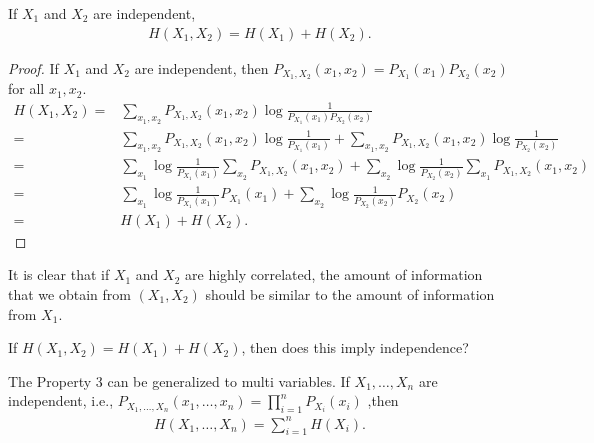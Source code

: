 \documentclass{article}
\begin{document}
\begin{theorem}
    If $X_1$ and $X_2$ are independent,
    \begin{align}
        H(X_1, X_2) = H(X_1) + H(X_2).
    \end{align}
\end{theorem}
\begin{proof}
If $X_1$ and $X_2$ are independent, then $P_{X_1, X_2} (x_1, x_2) = P_{X_1}(x_1) P_{X_2}(x_2)$ for all $x_1, x_2$.
\begin{align}
    H(X_1, X_2) =& \sum_{x_1, x_2} P_{X_1, X_2} (x_1, x_2) \log \frac{1}{P_{X_1}(x_1)P_{X_2}(x_2)}\\
    =& \sum_{x_1, x_2} P_{X_1, X_2} (x_1, x_2) \log \frac{1}{P_{X_1}(x_1)}
    + \sum_{x_1, x_2} P_{X_1, X_2} (x_1, x_2) \log \frac{1}{P_{X_2}(x_2)}\\
    =& \sum_{x_1}  \log \frac{1}{P_{X_1}(x_1)}\sum_{x_2}P_{X_1, X_2} (x_1, x_2)
    + \sum_{x_2} \log \frac{1}{P_{X_2}(x_2)}\sum_{x_1} P_{X_1, X_2} (x_1, x_2) \\
    =& \sum_{x_1}  \log \frac{1}{P_{X_1}(x_1)} P_{X_1} (x_1)
    + \sum_{x_2} \log \frac{1}{P_{X_2}(x_2)} P_{X_2} (x_2) \\
    =& H(X_1)+H(X_2).
\end{align}
\end{proof}
It is clear that if $X_1$ and $X_2$ are highly correlated,
the amount of information that we obtain from $(X_1, X_2)$ should be similar to
the amount of information from $X_1$.

\begin{exercise}
    If $H(X_1, X_2)=H(X_1) +H(X_2)$, then does this imply independence?
\end{exercise}

The Property 3 can be generalized to multi variables.
If $X_1, \dots, X_n$ are independent, i.e., $P_{X_1,\dots, X_n}(x_1,\dots, x_n) = \prod_{i=1}^n P_{X_i}(x_i)$ ,then
\begin{align}
    H(X_1,\dots, X_n) = \sum_{i=1}^n H(X_i).
\end{align}
\end{document}
